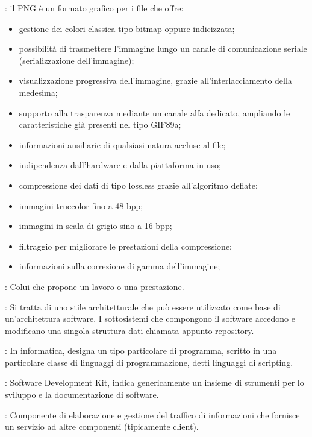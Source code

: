 {		: il PNG è un formato grafico per i file che offre:
  			\begin{itemize}
    		\item gestione dei colori classica tipo bitmap oppure indicizzata;
    		\item possibilità di trasmettere l'immagine lungo un canale di comunicazione seriale (serializzazione dell'immagine);
   			\item visualizzazione progressiva dell'immagine, grazie all'interlacciamento della medesima;
    		\item supporto alla trasparenza mediante un canale alfa dedicato, ampliando le caratteristiche già presenti nel tipo GIF89a;
    		\item informazioni ausiliarie di qualsiasi natura accluse al file;
    		\item indipendenza dall'hardware e dalla piattaforma in uso;
    		\item compressione dei dati di tipo lossless grazie all'algoritmo deflate;
    		\item immagini truecolor fino a 48 bpp;
    		\item immagini in scala di grigio sino a 16 bpp;
    		\item filtraggio per migliorare le prestazioni della compressione;
    		\item informazioni sulla correzione di gamma dell'immagine;
  			\end{itemize}

		: Colui che propone un lavoro o una prestazione.


		: Si tratta di uno stile architetturale che può essere utilizzato come base di un'architettura software. I sottosistemi che compongono il software accedono e modificano una singola struttura dati chiamata appunto repository.

		: In informatica, designa un tipo particolare di programma, scritto in una particolare classe di linguaggi di programmazione, detti linguaggi di scripting.

		: Software Development Kit, indica genericamente un insieme di strumenti per lo sviluppo e la documentazione di software.

		: Componente di elaborazione e gestione del traffico di informazioni che fornisce un servizio ad altre componenti (tipicamente client).

}
